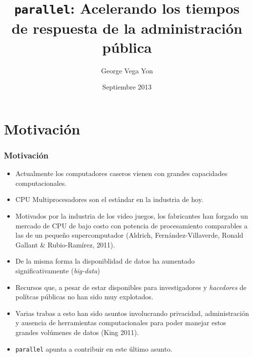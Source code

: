 \documentclass{beamer}
\title[{\tt parallel}: M\'odulo de Stata para computaci\'on en paralelo]{{\tt parallel}: Acelerando los tiempos de respuesta de la administraci\'on p\'ublica}
\author[GVY]{George Vega Yon}
\institute[SPensiones]{Superintendencia de Pensiones}
\date{Septiembre 2013}
\begin{document}
\frame{\maketitle}

\frame{\tableofcontents}

\section{Motivaci\'on}

\begin{frame}[allowframebreaks=.8]
\frametitle{Motivaci\'on}
\begin{itemize}
\item Actualmente los computadores caseros vienen con grandes capacidades computacionales.
\item CPU Multiprocesadores son el est\'andar en la industria de hoy.
\item Motivados por la industria de los video juegos, los fabricantes han forgado un mercado de CPU de bajo costo con potencia de procesamiento comparables a las de un peque\~no supercomputador (Aldrich, Fern\'andez-Villaverde, Ronald Gallant \& Rubio-Ram\'irez, 2011).
\item De la misma forma la disponiblidad de datos ha aumentado significativamente ({\it big-data})
\item Recursos que, a pesar de estar disponibles para investigadores y {\it hacedores} de pol\'itcas p\'ublicas no han sido muy explotados.
\item Varias trabas a esto han sido asuntos involucrando privacidad, administraci\'on y ausencia de herramientas computacionales para poder manejar estos grandes vol\'umenes de datos (King 2011).
\item {\tt parallel} apunta a contribuir en este \'ultimo asunto.
\end{itemize}
\end{frame}
\end{document}
